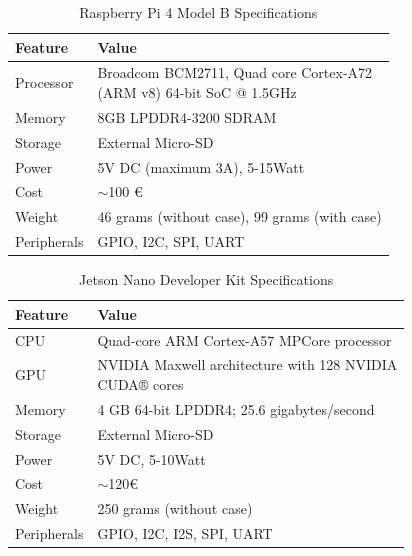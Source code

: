 \begin{table}[H]
  \caption[]{Raspberry Pi 4 Model B Specifications}
  \label{tab:1}
  \centering
  \begin{tabular}{ll}
      \hline
      \textbf{Feature} & \textbf{Value}  \\
      \hline
          Processor & \Centerstack{Broadcom BCM2711, Quad core Cortex-A72 \\(ARM v8) 64-bit SoC @ 1.5GHz }\\
          Memory & 8GB LPDDR4-3200 SDRAM \\
          Storage & External Micro-SD \\  
          Power & 5V DC (maximum 3A), 5-15Watt \\
          Cost & $\sim$100 €\\
          Weight & 46 grams (without case), 99 grams (with case) \\
          Peripherals & GPIO, I2C, SPI, UART \\
          \hline
  \end{tabular}
\end{table}


\begin{table}[H]
  \caption[]{Jetson Nano Developer Kit Specifications}
  \label{tab:2}
  \centering
  \begin{tabular}{ll}
      \hline
      \textbf{Feature} & \textbf{Value}  \\
      \hline
          CPU & Quad-core ARM Cortex-A57 MPCore processor\\
          GPU & \Centerstack{NVIDIA Maxwell architecture with 128 NVIDIA\\ CUDA® cores} \\
          Memory & 4 GB 64-bit LPDDR4; 25.6 gigabytes/second \\
          Storage & External Micro-SD \\  
          Power & 5V DC, 5-10Watt \\
          Cost & $\sim$120€\\
          Weight & 250 grams (without case)\\
          Peripherals & GPIO, I2C, I2S, SPI, UART \\
          \hline
  \end{tabular}
\end{table}